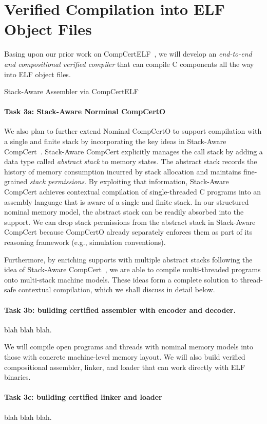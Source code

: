 \section{Verified Compilation into ELF Object Files}

Basing upon our prior work on CompCertELF~\cite{compcertelf20},
we will develop an {\em end-to-end and compositional
verified compiler} that can compile C components all the way into
ELF object files. 

Stack-Aware Assembler via CompCertELF

\paragraph*{Task 3a: Stack-Aware Norminal CompCertO}
We also plan to further extend Nominal CompCertO to support
compilation with a single and finite stack by incorporating the key
ideas in Stack-Aware CompCert~\cite{wang2019}. Stack-Aware CompCert
explicitly manages the call stack by adding a data type called
\emph{abstract stack} to memory states. The abstract stack records the
history of memory consumption incurred by stack allocation and
maintains fine-grained \emph{stack permissions}. By exploiting that
information, Stack-Aware CompCert achieves contextual compilation of
single-threaded C programs into an assembly language that is aware of
a single and finite stack.  In our structured nominal memory model,
the abstract stack can be readily absorbed into the support. We can
drop stack permissions from the abstract stack in Stack-Aware CompCert
because CompCertO already separately enforces them as part of its
reasoning framework (e.g., simulation conventions).

Furthermore, by enriching supports with multiple
abstract stacks following the idea of Stack-Aware
CompCert~\cite{wang2019}, we are able to compile multi-threaded
programs onto multi-stack machine models. These ideas form a complete
solution to thread-safe contextual compilation, which we shall
discuss in detail below.



\paragraph*{Task 3b: building certified assembler with encoder and decoder.}
blah blah blah.

We will compile open programs and threads with
  nominal memory models into those with concrete machine-level memory
  layout. We will also build verified compositional assembler,
  linker, and loader that can work directly with ELF binaries.
  

\paragraph*{Task 3c: building certified linker and loader}
blah blah blah.

   
   
